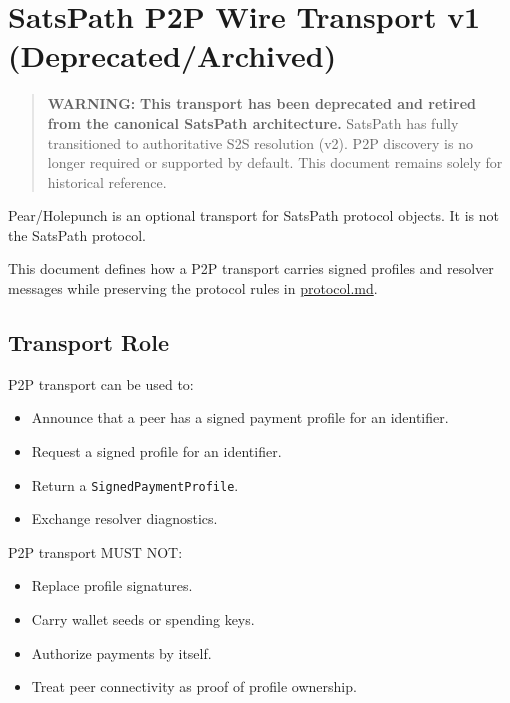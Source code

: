 \documentclass[
]{article}
\author{}
\date{}
\providecommand{\tightlist}{%
  \setlength{\itemsep}{0pt}\setlength{\parskip}{0pt}}
\begin{document}
\hypertarget{satspath-p2p-wire-transport-v1-deprecatedarchived}{%
\section{SatsPath P2P Wire Transport v1
(Deprecated/Archived)}\label{satspath-p2p-wire-transport-v1-deprecatedarchived}}

\begin{quote}
\textbf{WARNING:} \textbf{This transport has been deprecated and retired
from the canonical SatsPath architecture.} SatsPath has fully
transitioned to authoritative S2S resolution (v2). P2P discovery is no
longer required or supported by default. This document remains solely
for historical reference.
\end{quote}

Pear/Holepunch is an optional transport for SatsPath protocol objects.
It is not the SatsPath protocol.

This document defines how a P2P transport carries signed profiles and
resolver messages while preserving the protocol rules in
\href{./protocol.md}{protocol.md}.

\hypertarget{transport-role}{%
\subsection{Transport Role}\label{transport-role}}

P2P transport can be used to:

\begin{itemize}
\tightlist
\item
  Announce that a peer has a signed payment profile for an identifier.
\item
  Request a signed profile for an identifier.
\item
  Return a \texttt{SignedPaymentProfile}.
\item
  Exchange resolver diagnostics.
\end{itemize}

P2P transport MUST NOT:

\begin{itemize}
\tightlist
\item
  Replace profile signatures.
\item
  Carry wallet seeds or spending keys.
\item
  Authorize payments by itself.
\item
  Treat peer connectivity as proof of profile ownership.
\end{itemize}
\end{document}
